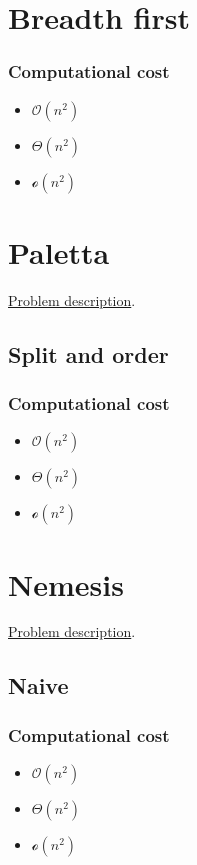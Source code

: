 \documentclass{article}
\begin{document}
\section{Breadth first}
\subsubsection{Computational cost}
\begin{itemize}
    \item $\mathcal{O}(n^{2})$
    \item $\Theta(n^{2})$
    \item $\mathcal{o}(n^{2})$
\end{itemize}

\section{Paletta}
\href{http://didawiki.cli.di.unipi.it/lib/exe/fetch.php/magistraleinformatica/alg2/algo2_16/paletta.pdf}{Problem description}.
\subsection{Split and order}
\subsubsection{Computational cost}
\begin{itemize}
    \item $\mathcal{O}(n^{2})$
    \item $\Theta(n^{2})$
    \item $\mathcal{o}(n^{2})$
\end{itemize}

\section{Nemesis}
\href{http://didawiki.cli.di.unipi.it/lib/exe/fetch.php/magistraleinformatica/alg2/algo2_16/nemesi.pdf}{Problem description}.
\subsection{Naive}
\subsubsection{Computational cost}
\begin{itemize}
    \item $\mathcal{O}(n^{2})$
    \item $\Theta(n^{2})$
    \item $\mathcal{o}(n^{2})$
\end{itemize}
\end{document}
